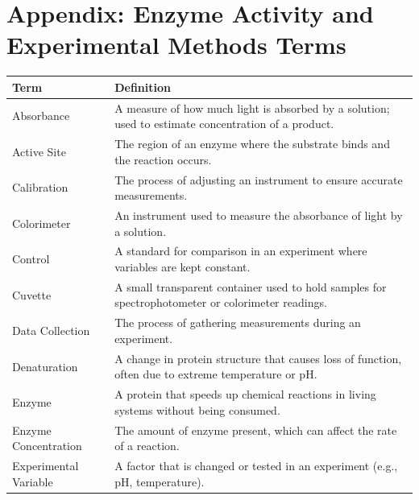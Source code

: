 \documentclass[
  letterpaper,
  DIV=11,
  numbers=noendperiod]{scrreprt}
\newcounter{none} %
\begin{document}
\section{\texorpdfstring{\textbf{Appendix: Enzyme Activity and
Experimental Methods
Terms}}{Appendix: Enzyme Activity and Experimental Methods Terms}}\label{appendix-enzyme-activity-and-experimental-methods-terms}

{\def\LTcaptype{none} %
\begin{longtable}[]{@{}
  >{\raggedright\arraybackslash}p{}
  >{\raggedright\arraybackslash}p{}@{}}
\toprule\noalign{}
\begin{minipage}[b]{\linewidth}\raggedright
Term
\end{minipage} & \begin{minipage}[b]{\linewidth}\raggedright
Definition
\end{minipage} \\
\midrule\noalign{}
\endhead
\bottomrule\noalign{}
\endlastfoot
Absorbance & A measure of how much light is absorbed by a solution; used
to estimate concentration of a product. \\
Active Site & The region of an enzyme where the substrate binds and the
reaction occurs. \\
Calibration & The process of adjusting an instrument to ensure accurate
measurements. \\
Colorimeter & An instrument used to measure the absorbance of light by a
solution. \\
Control & A standard for comparison in an experiment where variables are
kept constant. \\
Cuvette & A small transparent container used to hold samples for
spectrophotometer or colorimeter readings. \\
Data Collection & The process of gathering measurements during an
experiment. \\
Denaturation & A change in protein structure that causes loss of
function, often due to extreme temperature or pH. \\
Enzyme & A protein that speeds up chemical reactions in living systems
without being consumed. \\
Enzyme Concentration & The amount of enzyme present, which can affect
the rate of a reaction. \\
Experimental Variable & A factor that is changed or tested in an
experiment (e.g., pH, temperature). \\

\end{longtable}}
\end{document}
